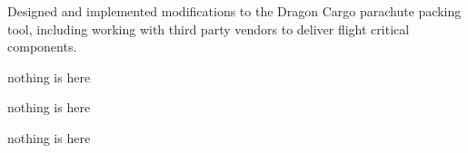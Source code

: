 \documentclass[10pt,final,sans]{resume}
\begin{document}
Designed and implemented modifications to the Dragon Cargo parachute packing tool, including working with third party vendors to deliver flight critical components.

nothing is here

nothing is here

nothing is here
\end{document}
